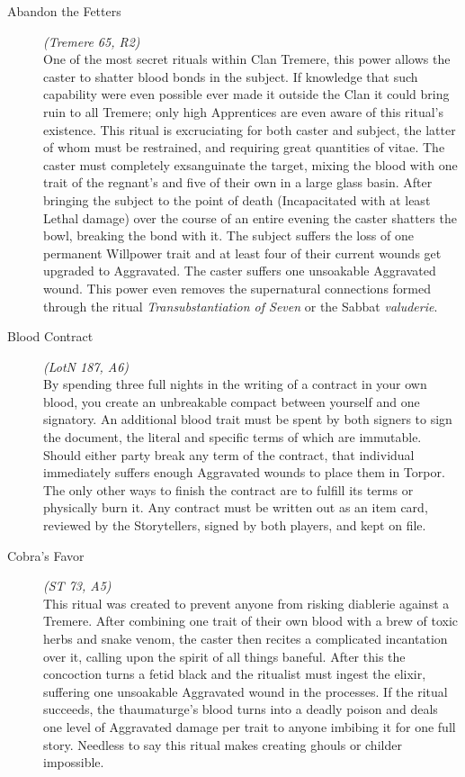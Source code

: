 \begin{description}

	\item[Abandon the Fetters] \emph{(Tremere 65, R2)} \hfill \\
	One of the most secret rituals within Clan Tremere, this power allows the caster to shatter blood bonds in the subject.  
	If knowledge that such capability were even possible ever made it outside the Clan it could bring ruin to all Tremere; 
	only high Apprentices are even aware of this ritual's existence.  This ritual is excruciating for both caster and subject, 
	the latter of whom must be restrained, and requiring great quantities of vitae.  The caster must completely exsanguinate 
	the target, mixing the blood with one trait of the regnant's and five of their own in a large glass basin.  After bringing 
	the subject to the point of death (Incapacitated with at least Lethal damage) over the course of an entire evening the 
	caster shatters the bowl, breaking the bond with it.  The subject suffers the loss of one permanent Willpower trait and at 
	least four of their current wounds get upgraded to Aggravated.  The caster suffers one unsoakable Aggravated wound.  This 
	power even removes the supernatural connections formed through the ritual \emph{Transubstantiation of Seven} or the Sabbat 
	\emph{valuderie}. \\

	\item[Blood Contract] \emph{(LotN 187, A6)} \hfill \\
	By spending three full nights in the writing of a contract in your own blood, you create an unbreakable compact between 
	yourself and one signatory.  An additional blood trait must be spent by both signers to sign the document, the literal and 
	specific terms of which are immutable.  Should either party break any term of the contract, that individual immediately 
	suffers enough Aggravated wounds to place them in Torpor.  The only other ways to finish the contract are to fulfill its 
	terms or physically burn it.  Any contract must be written out as an item card, reviewed by the Storytellers, signed by both 
	players, and kept on file. \\

	\item[Cobra's Favor] \emph{(ST 73, A5)} \hfill \\
	This ritual was created to prevent anyone from risking diablerie against a Tremere.  After combining one trait of their own 
	blood with a brew of toxic herbs and snake venom, the caster then recites a complicated incantation over it, calling upon 
	the spirit of all things baneful.  After this the concoction turns a fetid black and the ritualist must ingest the elixir, 
	suffering one unsoakable Aggravated wound in the processes.  If the ritual succeeds, the thaumaturge's blood turns into a 
	deadly poison and deals one level of Aggravated damage per trait to anyone imbibing it for one full story.  Needless to say 
	this ritual makes creating ghouls or childer impossible. \\


\end{description}
